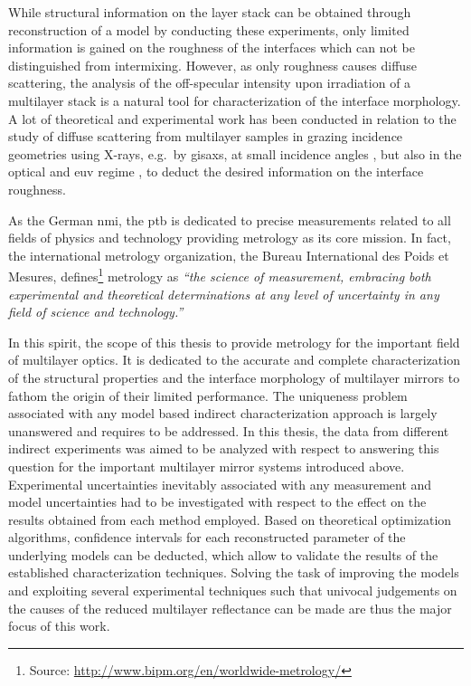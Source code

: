 While structural information on the layer stack can be obtained through reconstruction of a model by conducting these experiments, only limited information is gained on the roughness of the interfaces which can not be distinguished from intermixing. However, as only roughness causes diffuse scattering, the analysis of the off-specular intensity upon irradiation of a multilayer stack is a natural tool for characterization of the interface morphology. A lot of theoretical and experimental work has been conducted in relation to the study of diffuse scattering from multilayer samples in grazing incidence geometries using X-rays, e.g.~by \gls{gisaxs}, at small incidence angles \cite{mikulik_x-ray_1997, sinha_x-ray_1994, de_boer_x-ray_1995, de_boer_x-ray_1996, salditt_kinetic_1994, levine_grazing-incidence_1989,siffalovic_characterization_2009}, but also in the optical and \gls{euv} regime \cite{amra_light_1993, amra_light_1994, elson_light_1980, elson_relationship_1983, schroder_angle-resolved_2011, schroder_spectral_2014}, to deduct the desired information on the interface roughness.

As the German \gls{nmi}, the \gls{ptb} is dedicated to precise measurements related to all fields of physics and technology providing metrology as its core mission. In fact, the international metrology organization, the Bureau International des Poids et Mesures, defines\footnote{Source: \url{http://www.bipm.org/en/worldwide-metrology/}} metrology as \emph{``the science of measurement, embracing both experimental and theoretical determinations at any level of uncertainty in any field of science and technology.''}

In this spirit, the scope of this thesis to provide metrology for the important field of multilayer optics. It is dedicated to the accurate and complete characterization of the structural properties and the interface morphology of multilayer mirrors to fathom the origin of their limited performance. The uniqueness problem associated with any model based indirect characterization approach is largely unanswered and requires to be addressed. In this thesis, the data from different indirect experiments was aimed to be analyzed with respect to answering this question for the important multilayer mirror systems introduced above. Experimental uncertainties inevitably associated with any measurement and model uncertainties had to be investigated with respect to the effect on the results obtained from each method employed. Based on theoretical optimization algorithms, confidence intervals for each reconstructed parameter of the underlying models can be deducted, which allow to validate the results of the established characterization techniques. Solving the task of improving the models and exploiting several experimental techniques such that univocal judgements on the causes of the reduced multilayer reflectance can be made are thus the major focus of this work.

